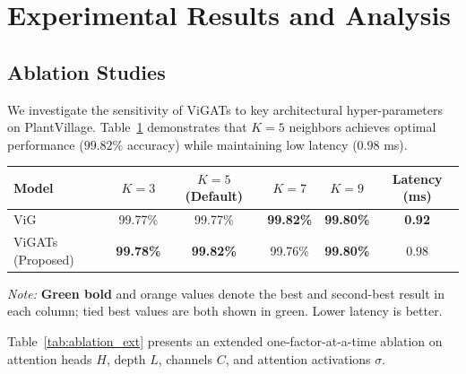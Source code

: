 \documentclass[]{interact}
\theoremstyle{plain}
\theoremstyle{definition}
\theoremstyle{remark}
\newcommand{\bestresult}[1]{\textcolor{bestgreen}{\textbf{#1}}}
\newcommand{\secondresult}[1]{\textcolor{secondorange}{#1}}
\begin{document}
\section{Experimental Results and Analysis}
{\color{blue}
\label{sec:results}

\subsection{Ablation Studies}
\label{sec:ablation}

We investigate the sensitivity of ViGATs to key architectural hyper-parameters on PlantVillage. Table~\ref{tab:ablation_k} demonstrates that $K=5$ neighbors achieves optimal performance ($99.82\%$ accuracy) while maintaining low latency ($0.98$ ms).

\begin{table}[H]
\small
{}
{\begin{tabular}{lccccc} \toprule
\textbf{Model} & \textbf{$K=3$} & \textbf{$K=5$ (Default)} & \textbf{$K=7$} & \textbf{$K=9$} & \textbf{Latency (ms)} \\ \midrule
ViG \citep{han2022vision} & \secondresult{99.77\%} & \secondresult{99.77\%} & \bestresult{99.82\%} & \bestresult{99.80\%} & \bestresult{0.92} \\
ViGATs (Proposed) & \bestresult{99.78\%} & \bestresult{99.82\%} & \secondresult{99.76\%} & \bestresult{99.80\%} & \secondresult{0.98} \\ \bottomrule
\end{tabular}}
\label{tab:ablation_k}
\parbox{\textwidth}{\vspace{2pt}\footnotesize\textit{Note:} \bestresult{Green bold} and \secondresult{orange} values denote the best and second-best result in each column; tied best values are both shown in green. Lower latency is better.}
\end{table}

Table~\ref{tab:ablation_ext} presents an extended one-factor-at-a-time ablation on attention heads $H$, depth $L$, channels $C$, and attention activations $\sigma$.

}
\end{document}
